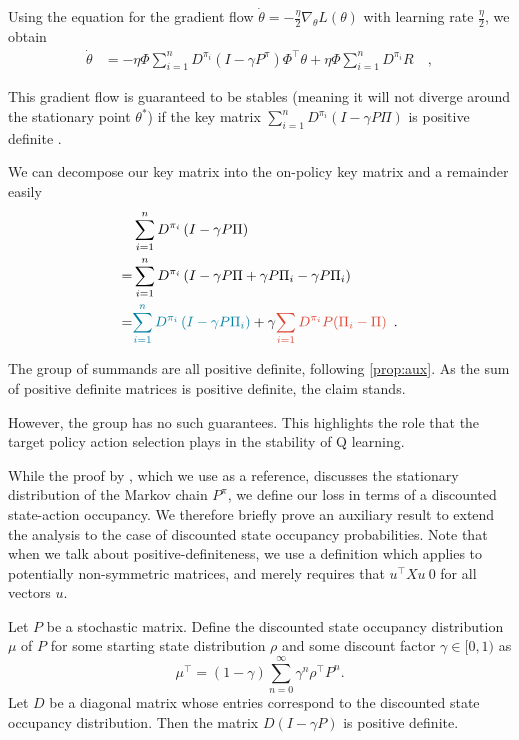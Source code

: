 Using the equation for the gradient flow $\dot{\theta} = - \frac{\eta}{2} \nabla_\theta L(\theta)$ with learning rate $\frac{\eta}{2}$, we obtain
\begin{align}
    \dot\theta &= - \eta \Phi \sum_{i=1}^n D^{\pi_i} \left(I - \gamma P^\pi \right)\Phi^\top \theta + \eta \Phi \sum_{i=1}^n D^{\pi_i} R\quad,
\end{align}

This gradient flow is guaranteed to be stables (meaning it will not diverge around the stationary point $\theta^*$) if the key matrix $\sum_{i=1}^n D^{\pi_i} \left(I - \gamma P \Pi \right)$ is positive definite \textcite{sutton1988learning}. 

We can decompose our key matrix into the on-policy key matrix and a remainder easily
\begin{align}
    &\sum_{i=1}^n D^{\pi_i} \left(I - \gamma P\Pi \right) \\
    =& \sum_{i=1}^n D^{\pi_i} \left(I - \gamma P\Pi + \gamma P\Pi_i - \gamma P\Pi_i \right) \\
    =& \blue{\sum_{i=1}^n D^{\pi_i} \left(I - \gamma P\Pi_i \right)} + \gamma \red{\sum_{i=1} D^{\pi_i}P (\Pi_i - \Pi)} \enspace .
\end{align}

The  group of summands are all positive definite, following \autoref{prop:aux}.
As the sum of positive definite matrices is positive definite, the claim stands.

However, the  group has no such guarantees.
This highlights the role that the target policy action selection plays in the stability of Q learning.


While the proof by \textcite{sutton1988learning}, which we use as a reference, discusses the stationary distribution of the Markov chain $P^\pi$, we define our loss in terms of a discounted state-action occupancy. 
We therefore briefly prove an auxiliary result to extend the analysis to the case of discounted state occupancy probabilities.
Note that when we talk about positive-definiteness, we use a definition which applies to potentially non-symmetric matrices, and merely requires that $u^\top X u \> 0$ for all vectors $u$.

\begin{proposition}
\label{prop:aux}
Let $P$ be a stochastic matrix. Define the discounted state occupancy distribution $\mu$ of $P$ for some starting state distribution $\rho$ and some discount factor $\gamma \in [0,1)$ as $$\mu^\top = (1 - \gamma) \sum_{n=0}^\infty \gamma^n \rho^\top P^n.$$ Let $D$ be a diagonal matrix whose entries correspond to the discounted state occupancy distribution.
Then the matrix $D(I - \gamma P)$ is positive definite.
\end{proposition}

